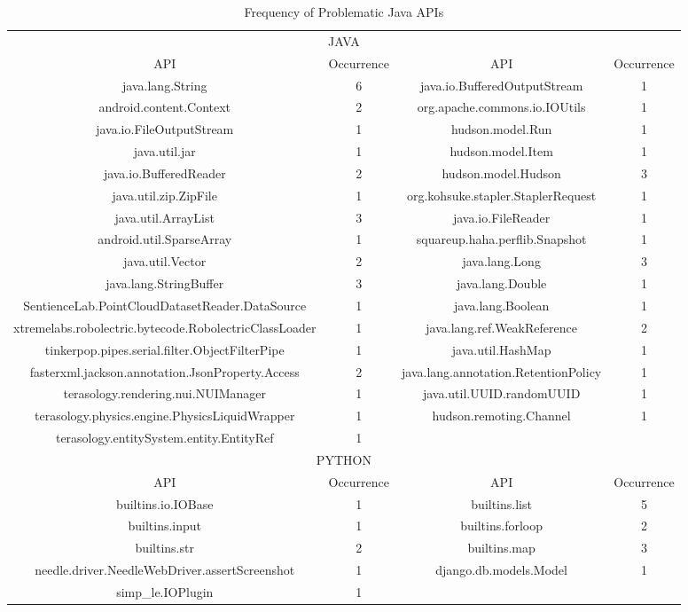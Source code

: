 \documentclass[sigconf]{acmart}
\begin{document}
\begin{table}[t]
  \caption{Frequency of Problematic Java APIs}
  \label{tab:apifreq}
  \addtolength{\tabcolsep}{4pt}
\begin{tabular}{ c c c c}
  \toprule
  \multicolumn{4}{c}{JAVA} \\
  
  API & Occurrence & API & Occurrence\\
  \midrule
  java.lang.String& 6               & java.io.BufferedOutputStream& 1\\
  android.content.Context& 2        & org.apache.commons.io.IOUtils& 1\\
  java.io.FileOutputStream& 1       & hudson.model.Run& 1\\
  java.util.jar& 1                  & hudson.model.Item& 1\\
  java.io.BufferedReader& 2         & hudson.model.Hudson& 3\\
  java.util.zip.ZipFile& 1          & org.kohsuke.stapler.StaplerRequest&1\\
  java.util.ArrayList& 3            & java.io.FileReader& 1\\
  android.util.SparseArray& 1       & squareup.haha.perflib.Snapshot& 1\\
  java.util.Vector& 2               & java.lang.Long& 3\\
  java.lang.StringBuffer& 3         & java.lang.Double& 1\\
  SentienceLab.PointCloudDatasetReader.DataSource& 1 & java.lang.Boolean&1\\
  xtremelabs.robolectric.bytecode.RobolectricClassLoader&1 &java.lang.ref.WeakReference&2    \\
  tinkerpop.pipes.serial.filter.ObjectFilterPipe& 1&java.util.HashMap& 1 \\                 fasterxml.jackson.annotation.JsonProperty.Access&2&java.lang.annotation.RetentionPolicy& 1\\
  terasology.rendering.nui.NUIManager& 1&java.util.UUID.randomUUID& 1\\
  terasology.physics.engine.PhysicsLiquidWrapper& 1&hudson.remoting.Channel& 1\\
  terasology.entitySystem.entity.EntityRef& 1&&\\
 
  \midrule
  
  \multicolumn{4}{c}{PYTHON} \\
  API & Occurrence & API & Occurrence\\
  \midrule
  builtins.io.IOBase& 1              & builtins.list& 5\\
  builtins.input& 1                  & builtins.forloop& 2\\
  builtins.str& 2                    & builtins.map& 3\\
  needle.driver.NeedleWebDriver.assertScreenshot& 1 & django.db.models.Model& 1\\
  simp\_le.IOPlugin& 1               &              &\\
  
  \bottomrule
\end{tabular}
\end{table}
\end{document}
